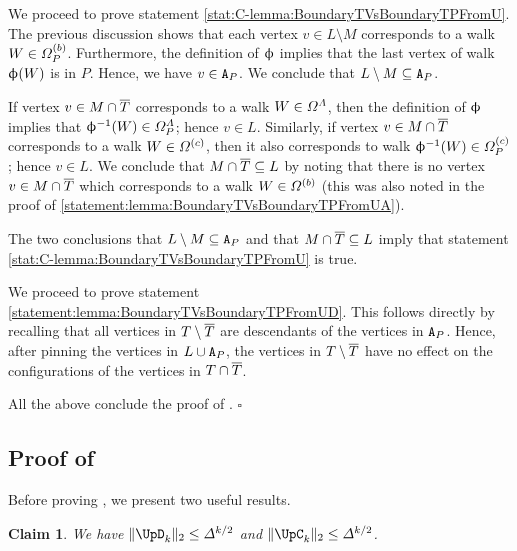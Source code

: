 \documentclass[11pt,reqno]{amsart}
\numberwithin{equation}{section}
\newtheorem{claim}[theorem]{Claim}
\newcommand{\blue}[1]{{\color{blue}#1}}
\newcommand{\bluepigment}[1]{{\color{blue(pigment)}#1}}
\newcommand{\cadmiumorange}[1]{{\color{cadmiumorange}#1}}
\newcommand{\electricviolet}[1]{{\color{electricviolet}#1}}
\newcommand{\goldenbrown}[1]{{\color{goldenbrown}#1}}
\newcommand{\maxDeg}{{\Delta}}
\newcommand{\norm}[2]{\goldenbrown{\|} #1 \goldenbrown{\|}_{#2}}
\newcommand{\VToEdge}{\UpD}
\newcommand{\EdgeToV}{\UpC}
\renewcommand{\blue}[1]{#1}
\renewcommand{\bluepigment}[1]{#1}
\renewcommand{\cadmiumorange}[1]{#1}
\renewcommand{\electricviolet}[1]{#1}
\renewcommand{\goldenbrown}[1]{#1}
\newcommand{\kk}{\bluepigment{k}}
\newcommand{\kL}{\cadmiumorange{L}}
\newcommand{\kP}{\goldenbrown{P}}
\newcommand{\kv}{\electricviolet{v}}
\newcommand{\kW}{\blue{W}}
\renewcommand{\kk}{k}
\renewcommand{\kL}{L}
\renewcommand{\kP}{P}
\renewcommand{\kv}{v}
\renewcommand{\kW}{W}
\begin{document}
We proceed to prove statement \ref{stat:C-lemma:BoundaryTVsBoundaryTPFromU}. The previous discussion
shows that  each vertex  $\kv\in \kL\setminus M$  corresponds to a walk $\kW\in \sawpaths^{(b)}_{\kP}$. 
Furthermore, the definition of $\upphi$ implies that the last vertex of walk $\BBijection(\kW)$ is in $\kP$. Hence, we have 
$\kv\in \cpT$. We conclude that $\kL\setminus M\subseteq \cpT$.
 


If vertex $\kv\in M\cap \SMTPu$ corresponds to a walk $\kW\in \sawpaths^{\Lambda}$, then the definition 
of $\upphi$ implies that $\BBijection^{-1}(\kW)\in \sawpaths^{\Lambda}_{\kP}$; hence $\kv\in \kL$. Similarly, if vertex
$\kv\in M\cap \SMTPu$ corresponds to a walk $\kW\in \sawpaths^{(c)}$, then it also corresponds to walk 
$\BBijection^{-1}(\kW)\in \sawpaths^{(c)}_{\kP}$; hence $\kv\in \kL$. 
We conclude that $M\cap \SMTPu\subseteq \kL$ 
by noting that there is no vertex $\kv\in M\cap \SMTPu$ which corresponds to a walk $\kW\in \sawpaths^{(b)}$
(this was also noted in  the proof of \ref{statement:lemma:BoundaryTVsBoundaryTPFromUA}).



The two conclusions that $\kL\setminus M\subseteq \cpT$ and that $M\cap \SMTPu\subseteq \kL$
imply that statement \ref{stat:C-lemma:BoundaryTVsBoundaryTPFromU} is true. 
 

We proceed to prove statement \ref{statement:lemma:BoundaryTVsBoundaryTPFromUD}. This follows directly by recalling 
that all vertices in $T\setminus \overline{T}$ are descendants of the vertices in $\cpT$. Hence, after pinning the vertices in $\kL\cup \cpT$, 
the vertices in $T\setminus \overline{T}$ have no effect on the configurations of the vertices in $T\cap \overline{T}$. 


All the above conclude the proof of . \hfill $\square$





\subsection{{Proof of }}\label{sec:proposition:CINorm2VsCLNorm2}

Before proving , we present two useful results.

\begin{claim}\label{claim:2NormBoundforVVsEdge-AAA}
We have $\norm{ \VToEdge_{\kk}}{2} \leq \maxDeg^{\kk/2}$ and $ \norm{ \EdgeToV_{\kk}}{2}\leq \maxDeg^{\kk/2}$.
\end{claim}
\end{document}
